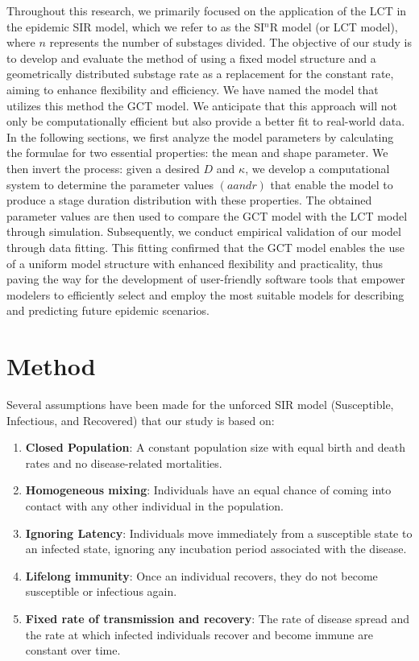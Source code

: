 \documentclass[12pt]{article}
\begin{document}
Throughout this research, we primarily focused on the application of the LCT in the epidemic SIR model, which we refer to as the SI$^n$R model (or LCT model), where $n$ represents the number of substages divided. The objective of our study is to develop and evaluate the method of using a fixed model structure and a geometrically distributed substage rate as a replacement for the constant rate, aiming to enhance flexibility and efficiency. We have named the model that utilizes this method the GCT model. We anticipate that this approach will not only be computationally efficient but also provide a better fit to real-world data. In the following sections, we first analyze the model parameters by calculating the formulae for two essential properties: the mean and shape parameter. We then invert the process: given a desired $D$ and $\kappa$, we develop a computational system to determine the parameter values $(a and r)$ that enable the model to produce a stage duration distribution with these properties. The obtained parameter values are then used to compare the GCT model with the LCT model through simulation. Subsequently, we conduct empirical validation of our model through data fitting. This fitting confirmed that the GCT model enables the use of a uniform model structure with enhanced flexibility and practicality, thus paving the way for the development of user-friendly software tools that empower modelers to efficiently select and employ the most suitable models for describing and predicting future epidemic scenarios.


\section{Method}
Several assumptions have been made for the unforced SIR model (Susceptible, Infectious, and Recovered) that our study is based on: 
\begin{enumerate}
    \item \textbf{Closed Population}: A constant population size with equal birth and death rates and no disease-related mortalities.
    \item \textbf{Homogeneous mixing}: Individuals have an equal chance of coming into contact with any other individual in the population. 
    \item \textbf{Ignoring Latency}: Individuals move immediately from a susceptible state to an infected state, ignoring any incubation period associated with the disease.
    \item \textbf{Lifelong immunity}: Once an individual recovers, they do not become susceptible or infectious again.
    \item \textbf{Fixed rate of transmission and recovery}: The rate of disease spread and the rate at which infected individuals recover and become immune are constant over time.
\end{enumerate}
\end{document}
